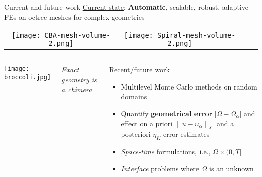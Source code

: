 \begin{frame}{Current and future work}
%
  \vspace{-0.5cm}
  \underline{Current state}: {\bfseries Automatic}, scalable, robust, adaptive FEs on octree meshes for complex geometries

  \begin{tabular}{cccc}
    \texttt{[image: CBA-mesh-volume-2.png]} &
    \texttt{[image: Spiral-mesh-volume-2.png]}
  \end{tabular}



  \begin{columns}


    \texttt{[image: broccoli.jpg]}

    \emph{\footnotesize Exact geometry is a chimera}


    \begin{block}{Recent/future work}
  \begin{itemize}

    \item Multilevel Monte Carlo methods on random domains

    \item Quantify {\bfseries geometrical error} $|\Omega - \Omega_\alpha|$ and effect on a priori $\| u - u_\alpha \|_{X}$ and a posteriori $\eta_K$ error estimates

    \item \emph{Space-time} formulations, i.e., $\Omega \times (0,T]$

    \item \emph{Interface} problems where $\Omega$ is an unknown

  \end{itemize}
\end{block}

\end{columns}

\end{frame}


%
%
%
%
%
%
%


